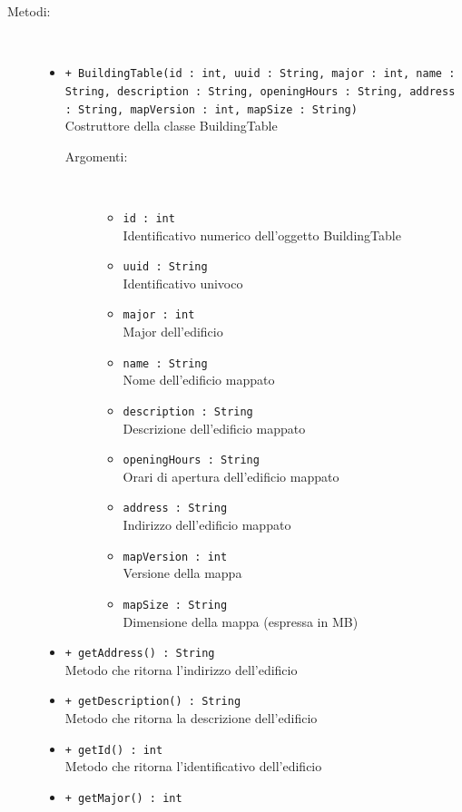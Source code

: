 \documentclass[../DefinizioneDiProdotto.tex]{subfiles}
\begin{document}
\begin{description}
\begin{itemize}
\end{itemize}
\item[Metodi:] \
\begin{itemize}
\item \texttt{+ BuildingTable(id : int, uuid : String, major : int, name : String, description : String, openingHours : String, address : String, mapVersion : int, mapSize : String)}\\
Costruttore della classe BuildingTable
 \begin{description}
\item[Argomenti:] \
\begin{itemize}
\item \texttt{id : int}\\
Identificativo numerico dell'oggetto BuildingTable\item \texttt{uuid : String}\\
Identificativo univoco\item \texttt{major : int}\\
Major dell'edificio\item \texttt{name : String}\\
Nome dell'edificio mappato\item \texttt{description : String}\\
Descrizione dell'edificio mappato\item \texttt{openingHours : String}\\
Orari di apertura dell'edificio mappato\item \texttt{address : String}\\
Indirizzo dell'edificio mappato\item \texttt{mapVersion : int}\\
Versione della mappa\item \texttt{mapSize : String}\\
Dimensione della mappa (espressa in MB)\end{itemize}
\end{description}
\item \texttt{+ getAddress() : String}\\
Metodo che ritorna l'indirizzo dell'edificio
 \item \texttt{+ getDescription() : String}\\
Metodo che ritorna la descrizione dell'edificio
 \item \texttt{+ getId() : int}\\
Metodo che ritorna l'identificativo dell'edificio
 \item \texttt{+ getMajor() : int}\\

\end{itemize}
\end{description}
\end{document}

